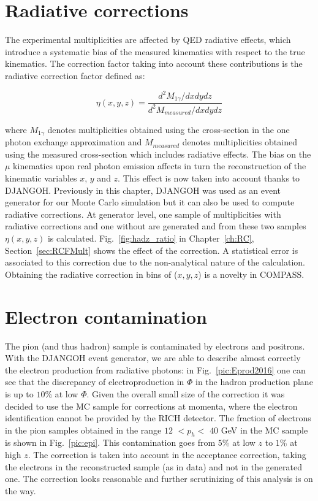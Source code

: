 \section{Radiative corrections} \label{sec:rcf}

The experimental multiplicities are affected by QED radiative effects, which introduce a systematic bias of the measured kinematics with respect to the true kinematics. The correction factor taking into account these contributions is the radiative correction factor defined as:

\begin{equation}
	\eta(x,y,z) = \frac{d^2 M_{1\gamma}/dxdydz}{d^2 M_{measured}/dxdydz}
\end{equation}

where $M_{1\gamma}$ denotes multiplicities obtained using the cross-section in the one photon exchange approximation and $M_{measured}$ denotes multiplicities obtained using the measured cross-section which includes radiative effects. The bias on the $\mu$ kinematics upon real photon emission affects in turn the reconstruction of the kinematic variables $x$, $y$ and $z$. This effect is now taken into account thanks to DJANGOH. Previously in this chapter, DJANGOH was used as an event generator for our Monte Carlo simulation but it can also be used to compute radiative corrections. At generator level, one sample of multiplicities with radiative corrections and one without are generated and from these two samples $\eta(x,y,z)$ is calculated. Fig.~\ref{fig:hadz_ratio} in Chapter~\ref{ch:RC}, Section~\ref{sec:RCFMult} shows the effect of the correction. A statistical error is associated to this correction due to the non-analytical nature of the calculation. Obtaining the radiative correction in bins of ($x,y,z$) is a novelty in COMPASS.

\section{Electron contamination}

The pion (and thus hadron) sample is contaminated by electrons and positrons. With the DJANGOH event generator, we are able to describe almost correctly the electron production from radiative photons: in Fig.~\ref{pic:Eprod2016} one can see that the discrepancy of electroproduction in $\Phi$ in the hadron production plane is up to $10$\% at low $\Phi$. Given the overall small size of the correction it was decided to use the MC sample for corrections at momenta, where the electron identification cannot be provided by the RICH detector. The fraction of electrons in the pion samples obtained in the range $12$ $< p_h <$ $40$ GeV in the MC sample is shown in Fig.~\ref{pic:epi}. This contamination goes from $5$\% at low $z$ to $1$\% at high $z$. The correction is taken into account in the acceptance correction, taking the electrons in the reconstructed sample (as in data) and not in the generated one. The correction looks reasonable and further scrutinizing of this analysis is on the way.

